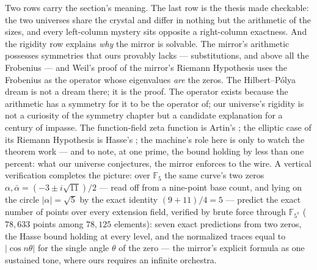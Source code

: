 \documentclass[11pt]{article}
\theoremstyle{remark}
\begin{document}
Two rows carry the section's meaning. The last row is the thesis made checkable: the two universes
share the crystal and differ in nothing but the arithmetic of the sizes, and every left-column
mystery sits opposite a right-column exactness. And the rigidity row explains \emph{why} the mirror
is solvable. The mirror's arithmetic possesses symmetries that ours provably lacks --- substitutions,
and above all the Frobenius --- and Weil's proof of the mirror's Riemann Hypothesis \cite{Weil49}
uses the Frobenius as the operator whose eigenvalues \emph{are} the zeros. The Hilbert--P\'olya dream
is not a dream there; it is the proof. The operator exists because the arithmetic has a symmetry for
it to be the operator of; our universe's rigidity is not a curiosity of the symmetry chapter but a
candidate explanation for a century of impasse. The function-field zeta function is Artin's
\cite{Artin}; the elliptic case of its Riemann Hypothesis is Hasse's \cite{Hasse}; the machine's role
here is only to watch the theorem work --- and to note, at one prime, the bound holding by less than
one percent: what our universe conjectures, the mirror enforces to the wire. A vertical verification completes
the picture: over $\mathbb{F}_5$ the same curve's two zeros
$\alpha, \bar\alpha = (-3 \pm i\sqrt{11})/2$ --- read off from a nine-point base count, and lying
on the circle $|\alpha| = \sqrt5$ by the exact identity $(9 + 11)/4 = 5$ --- predict the exact
number of points over every extension field, verified by brute force through $\mathbb{F}_{5^7}$
($78{,}633$ points among $78{,}125$ elements): seven exact predictions from two zeros, the Hasse
bound holding at every level, and the normalized traces equal to $|\cos n\theta|$ for the single
angle $\theta$ of the zero --- the mirror's explicit formula as one sustained tone, where ours
requires an infinite orchestra.
\end{document}

